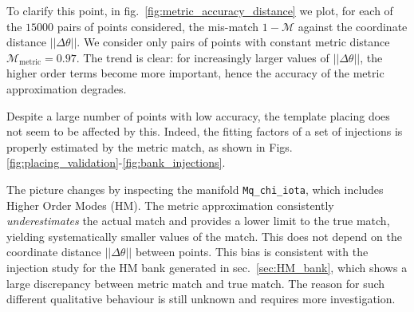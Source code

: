 \documentclass[twocolumn,showpacs,preprintnumbers,nofootinbib,prd,
superscriptaddress,10pt]{revtex4-2}
\begin{document}
To clarify this point, in fig.~\ref{fig:metric_accuracy_distance} we plot, for each of the $15000$ pairs of points considered, the mis-match $1-\mathcal{M}$ against the coordinate distance $||\Delta\theta||$. We consider only pairs of points with constant metric distance $\mathcal{M}_{\text{metric}} = 0.97$. The trend is clear: for increasingly larger values of $||\Delta\theta||$, the higher order terms become more important, hence the accuracy of the metric approximation degrades.

Despite a large number of points with low accuracy, the template placing does not seem to be affected by this. Indeed, the fitting factors of a set of injections is properly estimated by the metric match, as shown in Figs.\ref{fig:placing_validation}-\ref{fig:bank_injections}.

The picture changes by inspecting the manifold \texttt{Mq\_chi\_iota}, which includes Higher Order Modes (HM).
The metric approximation consistently {\it underestimates} the actual match and provides a lower limit to the true match, yielding systematically smaller values of the match. This does not depend on the coordinate distance $||\Delta\theta||$ between points.
This bias is consistent with the injection study for the HM bank generated in sec.~\ref{sec:HM_bank}, which shows a large discrepancy between metric match and true match.
The reason for such different qualitative behaviour is still unknown and requires more investigation. 
\end{document}
